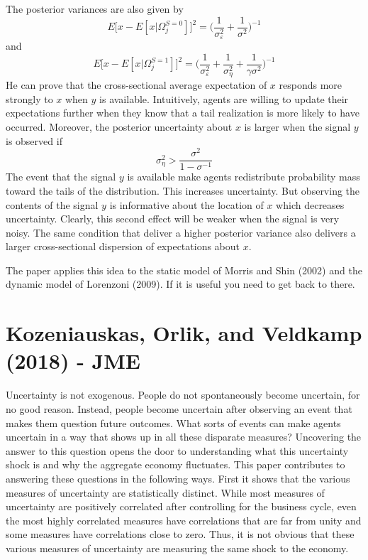 \documentclass{article}
\begin{document}
{The posterior variances are also given by
$$
E \big[x - E[x|\Omega^{S=0}_j] \big]^2 = \bigg( \frac{1}{\sigma^2_{\varepsilon}} + \frac{1}{\sigma^2}  \bigg)^{-1}
$$
and
$$
E \big[x - E[x|\Omega^{S=1}_j] \big]^2 = \bigg( \frac{1}{\sigma^2_{\varepsilon}} + \frac{1}{\sigma_{\eta}^2} + \frac{1}{\gamma \sigma^2}  \bigg)^{-1}
$$
He can prove that the cross-sectional average expectation of $x$ responds more strongly to $x$ when $y$ is available. Intuitively, agents are willing to update their expectations further when they know that a tail realization is more likely to have occurred. Moreover, the posterior uncertainty about $x$ is larger when the signal $y$ is observed if
$$
\sigma^2_{\eta} > \frac{\sigma^2}{1 - \sigma^{-1}}
$$
The event that the signal $y$ is available make agents redistribute probability mass toward the tails of the distribution. This increases uncertainty. But observing the contents of the signal $y$ is informative about the location of $x$ which decreases uncertainty. Clearly, this second effect will be weaker when the signal is very noisy. The same condition that deliver a higher posterior variance also delivers a larger cross-sectional dispersion of expectations about $x$.

The paper applies this idea to the static model of Morris and Shin (2002) and the dynamic model of Lorenzoni (2009). If it is useful you need to get back to there. 


\section*{Kozeniauskas, Orlik, and Veldkamp (2018) - JME}

Uncertainty is not exogenous. People do not spontaneously become uncertain, for no good reason. Instead, people become uncertain after observing an event that makes them question future outcomes. What sorts of events can make agents uncertain in a way that shows up in all these disparate measures? Uncovering the answer to this question opens the door to understanding what this uncertainty shock is and why the aggregate economy fluctuates. This paper contributes to answering these questions in the following ways. First it shows that the various measures of uncertainty are statistically distinct. While most measures of uncertainty are positively correlated after controlling for the business cycle, even the most highly correlated measures have correlations that are far from unity and some measures have correlations close to zero. Thus, it is not obvious that these various measures of uncertainty are measuring the same shock to the economy.

}
\end{document}
